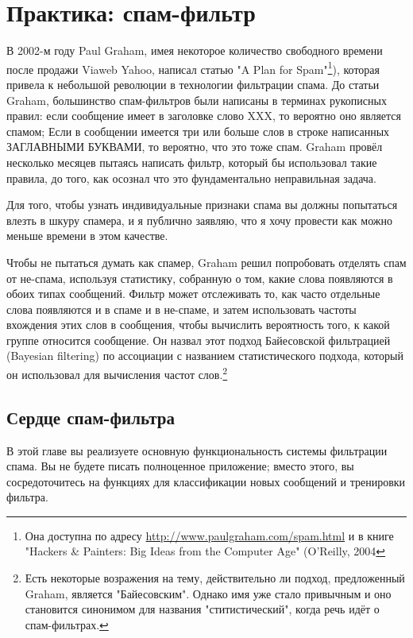 \chapter{Практика: спам-фильтр}
\label{ch:23}

В 2002-м году Paul Graham, имея некоторое количество свободного времени после продажи
Viaweb Yahoo, написал статью "A Plan for Spam"\footnote{Она доступна по адресу
  \url{http://www.paulgraham.com/spam.html} и в книге "Hackers \& Painters: Big Ideas from
  the Computer Age" (O'Reilly, 2004}), которая привела к небольшой революции в технологии
фильтрации спама.  До статьи Graham, большинство спам-фильтров были написаны в терминах
рукописных правил: если сообщение имеет в заголовке слово XXX, то вероятно оно является
спамом; Если в сообщении имеется три или больше слов в строке написанных ЗАГЛАВНЫМИ
БУКВАМИ, то вероятно, что это тоже спам. Graham провёл несколько месяцев пытаясь написать
фильтр, который бы использовал такие правила, до того, как осознал что это фундаментально
неправильная задача.

Для того, чтобы узнать индивидуальные признаки спама вы должны попытаться влезть в шкуру
спамера, и я публично заявляю, что я хочу провести как можно меньше времени в этом
качестве.

Чтобы не пытаться думать как спамер, Graham решил попробовать отделять спам от не-спама,
используя статистику, собранную о том, какие слова появляются в обоих типах сообщений.
Фильтр может отслеживать то, как часто отдельные слова появляются и в спаме и в не-спаме,
и затем использовать частоты вхождения этих слов в сообщения, чтобы вычислить вероятность
того, к какой группе относится сообщение.  Он назвал этот подход Байесовской фильтрацией
(Bayesian filtering) по ассоциации с названием статистического подхода, который он
использовал для вычисления частот слов.\footnote{Есть некоторые возражения на тему,
  действительно ли подход, предложенный Graham, является "Байесовским".  Однако имя уже
  стало привычным и оно становится синонимом для названия "ститистический", когда речь
  идёт о спам-фильтрах.}

\section{Сердце спам-фильтра}

В этой главе вы реализуете основную функциональность системы фильтрации спама.  Вы не
будете писать полноценное приложение; вместо этого, вы сосредоточитесь на функциях для
классификации новых сообщений и тренировки фильтра.

